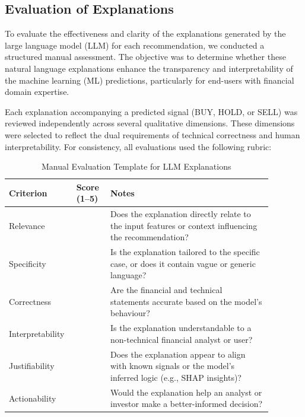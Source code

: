 \subsection{Evaluation of Explanations}

To evaluate the effectiveness and clarity of the explanations generated by the large language model (LLM) for each recommendation, we conducted a structured manual assessment. The objective was to determine whether these natural language explanations enhance the transparency and interpretability of the machine learning (ML) predictions, particularly for end-users with financial domain expertise.

Each explanation accompanying a predicted signal (BUY, HOLD, or SELL) was reviewed independently across several qualitative dimensions. These dimensions were selected to reflect the dual requirements of technical correctness and human interpretability. For consistency, all evaluations used the following rubric:

\begin{table}[h]
  \centering
  \caption{Manual Evaluation Template for LLM Explanations}
  \label{tab:llm_eval_template}
  \begin{tabular}{|p{0.18\linewidth}|p{0.12\linewidth}|p{0.58\linewidth}|}
    \hline
    \textbf{Criterion} & \textbf{Score (1–5)} & \textbf{Notes} \\
    \hline
    Relevance &  & Does the explanation directly relate to the input features or context influencing the recommendation? \\
    \hline
    Specificity &  & Is the explanation tailored to the specific case, or does it contain vague or generic language? \\
    \hline
    Correctness &  & Are the financial and technical statements accurate based on the model's behaviour? \\
    \hline
    Interpretability &  & Is the explanation understandable to a non-technical financial analyst or user? \\
    \hline
    Justifiability &  & Does the explanation appear to align with known signals or the model’s inferred logic (e.g., SHAP insights)? \\
    \hline
    Actionability &  & Would the explanation help an analyst or investor make a better-informed decision? \\
    \hline
  \end{tabular}
\end{table}
\FloatBarrier

